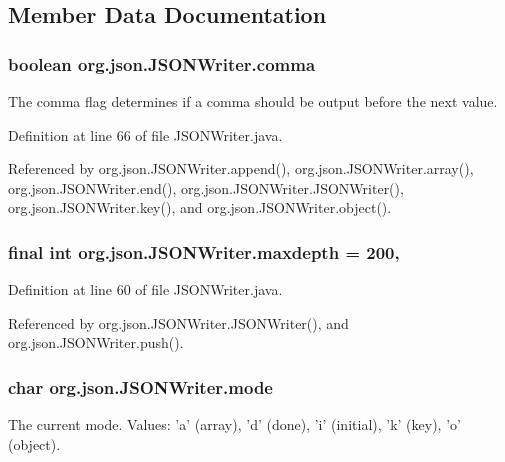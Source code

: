 \subsection{Member Data Documentation}
\hypertarget{classorg_1_1json_1_1_j_s_o_n_writer_a2370b9e0c4400cc324ba5fb32a1ed311}{
\subsubsection[{comma}]{\setlength{\rightskip}{0pt plus 5cm}boolean org.\-json.\-J\-S\-O\-N\-Writer.\-comma\hspace{0.3cm}{\ttfamily [private]}}}\label{classorg_1_1json_1_1_j_s_o_n_writer_a2370b9e0c4400cc324ba5fb32a1ed311}
The comma flag determines if a comma should be output before the next value. 

Definition at line 66 of file J\-S\-O\-N\-Writer.\-java.



Referenced by org.\-json.\-J\-S\-O\-N\-Writer.\-append(), org.\-json.\-J\-S\-O\-N\-Writer.\-array(), org.\-json.\-J\-S\-O\-N\-Writer.\-end(), org.\-json.\-J\-S\-O\-N\-Writer.\-J\-S\-O\-N\-Writer(), org.\-json.\-J\-S\-O\-N\-Writer.\-key(), and org.\-json.\-J\-S\-O\-N\-Writer.\-object().

\hypertarget{classorg_1_1json_1_1_j_s_o_n_writer_a91e980e27ba1a1130621393aa245491a}{
\subsubsection[{maxdepth}]{\setlength{\rightskip}{0pt plus 5cm}final int org.\-json.\-J\-S\-O\-N\-Writer.\-maxdepth = 200\hspace{0.3cm}{\ttfamily [static]}, {\ttfamily [private]}}}\label{classorg_1_1json_1_1_j_s_o_n_writer_a91e980e27ba1a1130621393aa245491a}


Definition at line 60 of file J\-S\-O\-N\-Writer.\-java.



Referenced by org.\-json.\-J\-S\-O\-N\-Writer.\-J\-S\-O\-N\-Writer(), and org.\-json.\-J\-S\-O\-N\-Writer.\-push().

\hypertarget{classorg_1_1json_1_1_j_s_o_n_writer_acabe6b245b148eabfaa3cf975f98073f}{
\subsubsection[{mode}]{\setlength{\rightskip}{0pt plus 5cm}char org.\-json.\-J\-S\-O\-N\-Writer.\-mode\hspace{0.3cm}{\ttfamily [protected]}}}\label{classorg_1_1json_1_1_j_s_o_n_writer_acabe6b245b148eabfaa3cf975f98073f}
The current mode. Values\-: 'a' (array), 'd' (done), 'i' (initial), 'k' (key), 'o' (object). 

